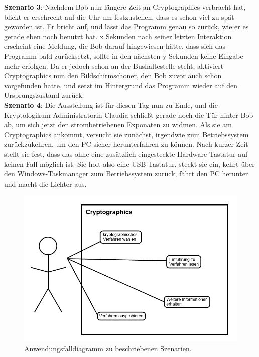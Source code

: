 \documentclass{article}
\begin{document}
\textbf{Szenario 3}:
Nachdem Bob nun längere Zeit an Cryptographics verbracht hat, blickt er erschreckt auf die Uhr um festzustellen, dass es schon viel zu spät geworden ist. Er bricht auf, und lässt das Programm genau so zurück, wie er es gerade eben noch benutzt hat. x Sekunden nach seiner letzten Interaktion erscheint eine Meldung, die Bob darauf hingewiesen hätte, dass sich das Programm bald zurücksetzt, sollte in den nächsten y Sekunden keine Eingabe mehr erfolgen. Da er jedoch schon an der Bushaltestelle steht, aktiviert Cryptographics nun den Bildschirmschoner, den Bob zuvor auch schon vorgefunden hatte, und setzt im Hintergrund das Programm wieder auf den Ursprungszustand zurück.\\

\textbf{Szenario 4}:
Die Ausstellung ist für diesen Tag nun zu Ende, und die Kryptologikum-Administratorin Claudia schließt gerade noch die Tür hinter Bob ab, um sich jetzt den strombetriebenen Exponaten zu widmen. Als sie am Cryptographics ankommt, versucht sie zunächst, irgendwie zum Betriebssystem zurückzukehren, um den PC sicher herunterfahren zu können. Nach kurzer Zeit stellt sie fest, dass das ohne eine zusätzlich eingesteckte Hardware-Tastatur auf keinen Fall möglich ist. Sie holt also eine USB-Tastatur, steckt sie ein, kehrt über den Windows-Taskmanager zum Betriebssystem zurück, fährt den PC herunter und macht die Lichter aus.\\

\begin{figure}[h!]
  \centering
    \includegraphics[width=\textwidth]{resources/usecase1}
  \caption{Anwendungsfalldiagramm zu beschriebenen Szenarien.}
\end{figure}
\end{document}
